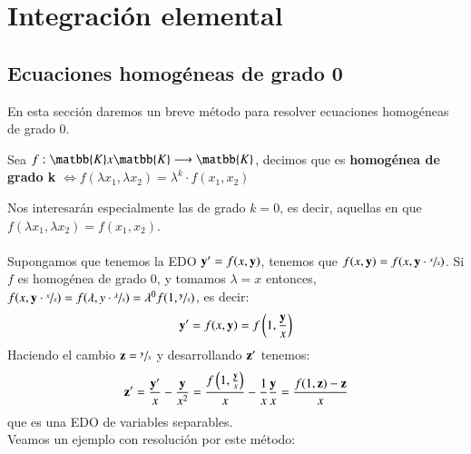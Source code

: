 
\chapter{Integraci\'{o}n elemental}
\section{Ecuaciones homog\'{e}neas de grado 0}
En esta sección daremos un breve método para resolver ecuaciones homogéneas de grado $0$.
\begin{dfn}
    Sea $f: \matbb{K} x \matbb{K} \longrightarrow \matbb{K}$, decimos que es \textbf{homogénea de grado k} $\iff f(\lambda x_1, \lambda x_2) = \lambda^k \cdot f(x_1, x_2)$
\end{dfn}
Nos interesarán especialmente las de grado $k=0$, es decir, aquellas en que $f(\lambda x_1, \lambda x_2) = f(x_1, x_2)$.\\\\
Supongamos que tenemos la EDO $\mathbf{y'} = f(x, \mathbf{y})$, tenemos que $f(x, \mathbf{y}) = f(x, \mathbf{y} \cdot \sfrac{x}{x})$. Si $f$ es homogénea de grado 0, y tomamos $\lambda = x$ entonces, $f(x, \mathbf{y} \cdot \sfrac{x}{x}) = f(\lambda, y \cdot \sfrac{\lambda}{x}) = \lambda^0 f(1, \sfrac{\mathbf{y}}{x})$, es decir:
$$
    \mathbf{y}' = f(x,\mathbf{y}) = f\left(1, \frac{\mathbf{y}}{x}\right)
$$
Haciendo el cambio $\mathbf{z} = \sfrac{\mathbf{y}}{x}$ y desarrollando $\mathbf{z'}$ tenemos:
$$
    \mathbf{z'} = \frac{\mathbf{y'}}{x} - \frac{\mathbf{y}}{x^2} = \frac{f\left(1,\frac{\mathbf{y}}{x}\right)}{x} - \frac{1}{x} \frac{\mathbf{y}}{x} = \frac{f(1,\mathbf{z}) - \mathbf{z}}{x}
$$
que es una EDO de variables separables.\\Veamos un ejemplo con resolución por este método:
